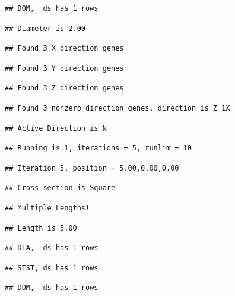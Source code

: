 \documentclass[]{article}
\begin{document}
\begin{verbatim}
## DOM,  ds has 1 rows
\end{verbatim}

\begin{verbatim}
## Diameter is 2.00
\end{verbatim}

\begin{verbatim}
## Found 3 X direction genes
\end{verbatim}

\begin{verbatim}
## Found 3 Y direction genes
\end{verbatim}

\begin{verbatim}
## Found 3 Z direction genes
\end{verbatim}

\begin{verbatim}
## Found 3 nonzero direction genes, direction is Z_1X
\end{verbatim}

\begin{verbatim}
## Active Direction is N
\end{verbatim}

\begin{verbatim}
## Running is 1, iterations = 5, runlim = 10
\end{verbatim}

\begin{verbatim}
## Iteration 5, position = 5.00,0.00,0.00
\end{verbatim}

\begin{verbatim}
## Cross section is Square
\end{verbatim}

\begin{verbatim}
## Multiple Lengths!
\end{verbatim}

\begin{verbatim}
## Length is 5.00
\end{verbatim}

\begin{verbatim}
## DIA,  ds has 1 rows
\end{verbatim}

\begin{verbatim}
## STST, ds has 1 rows
\end{verbatim}

\begin{verbatim}
## DOM,  ds has 1 rows
\end{verbatim}
\end{document}
